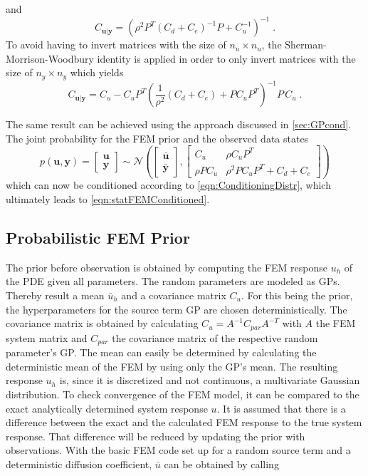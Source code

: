 \documentclass[%
  a4paper,oneside,%
  11pt,%
  smallchapters,
  style=printdev,
  extramargin,
  green,%
  rgb, <cmyk>
  ]{tubsbook}
\begin{document}
and
\begin{equation}
C_{\bm{u}|\bm{y}} = \left(      \rho^2  P^T   (C_d + C_e)^{-1}  P  +  C_u^{-1}    \right)^{-1} \;.
\end{equation}
To avoid having to invert matrices with the size of $n_u \times n_u$, the Sherman-Morrison-Woodbury identity \cite{riedel1992} is applied \cite{girolami2021} in order to only invert matrices with the size of $n_y \times n_y$ which yields
\begin{equation}
C_{\bm{u}|\bm{y}} = C_u - C_u P^T (\frac{1}{\rho^2} (C_d + C_e) + P C_u P^T)^{-1} P\,C_u \;.
\end{equation}

The same result can be achieved using the approach discussed in \ref{sec:GPcond}. The joint probability for the FEM prior and the observed data states
\begin{equation}
p(\bm{u},\bm{y}) = \begin{bmatrix}
           \bm{u}\\
          \bm{y}
         \end{bmatrix} \sim \mathcal{N}\left( \begin{bmatrix}
           \bar{\bm{u}}  \\
           \bar{\bm{y}}
         \end{bmatrix}, \begin{bmatrix}
C_u & \rho C_u P^T \\
\rho P C_u  & \rho^2 P C_u P^T + C_d + C_e 
\end{bmatrix}  \right)
\end{equation}
which can now be conditioned according to \ref{eqn:ConditioningDistr}, which ultimately leads to \ref{eqn:statFEMConditioned}.



\subsection{Probabilistic FEM Prior}
The prior before observation is obtained by computing the FEM response $u_h$ of the PDE given all parameters. The random parameters are modeled as GPs. Thereby result a mean $\bar{u}_h$ and a covariance matrix $C_u$. For this being the prior, the hyperparameters for the source term GP are chosen deterministically. The covariance matrix is obtained by calculating $C_u = A^{-1} C_{par} A^{-T}$ with $A$ the FEM system matrix and $C_{par}$ the covariance matrix of the respective random parameter's GP. The mean can easily be determined by calculating the deterministic mean of the FEM by using only the GP's mean.
The resulting response $u_h$ is, since it is discretized and not continuous, a multivariate Gaussian distribution.
%
To check convergence of the FEM model, it can be compared to the exact analytically determined system response $u$. 
%
It is assumed that there is a difference between the exact and the calculated FEM response to the true system response. That difference will be reduced by updating the prior with observations.
%
With the basic FEM code set up for a random source term and a deterministic diffusion coefficient, $\bar{u}$ can be obtained by calling
\end{document}
